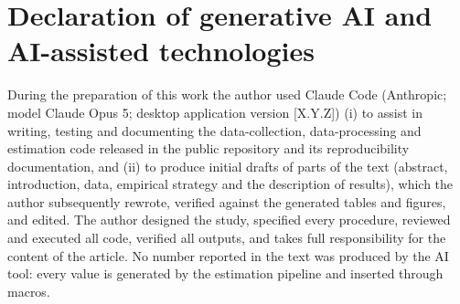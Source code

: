 
\section*{Declaration of generative AI and AI-assisted technologies}
During the preparation of this work the author used Claude Code (Anthropic;
model Claude Opus 5; desktop application version [X.Y.Z]) (i) to assist in
writing, testing and documenting the data-collection, data-processing and
estimation code released in the public repository and its reproducibility
documentation, and (ii) to produce initial drafts of parts of the text
(abstract, introduction, data, empirical strategy and the description of
results), which the author subsequently rewrote, verified against the
generated tables and figures, and edited. The author designed the study,
specified every procedure, reviewed and executed all code, verified all
outputs, and takes full responsibility for the content of the article. No
number reported in the text was produced by the AI tool: every value is
generated by the estimation pipeline and inserted through macros.
